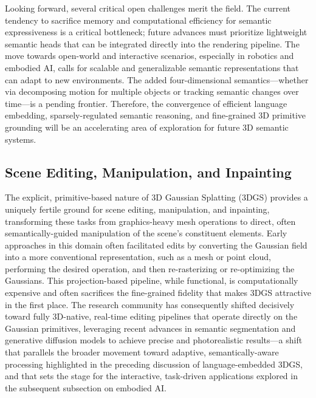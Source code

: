 \documentclass[11pt,a4paper]{article}
\begin{document}
Looking forward, several critical open challenges merit the field. The current tendency to sacrifice memory and computational efficiency for semantic expressiveness is a critical bottleneck; future advances must prioritize lightweight semantic heads that can be integrated directly into the rendering pipeline. The move towards open-world and interactive scenarios, especially in robotics and embodied AI, calls for scalable and generalizable semantic representations that can adapt to new environments. The added four-dimensional semantics---whether via decomposing motion for multiple objects or tracking semantic changes over time---is a pending frontier. Therefore, the convergence of efficient language embedding, sparsely-regulated semantic reasoning, and fine-grained 3D primitive grounding will be an accelerating area of exploration for future 3D semantic systems.


\subsection{Scene Editing, Manipulation, and Inpainting}


The explicit, primitive-based nature of 3D Gaussian Splatting (3DGS) provides a uniquely fertile ground for scene editing, manipulation, and inpainting, transforming these tasks from graphics-heavy mesh operations to direct, often semantically-guided manipulation of the scene's constituent elements. Early approaches in this domain often facilitated edits by converting the Gaussian field into a more conventional representation, such as a mesh or point cloud, performing the desired operation, and then re-rasterizing or re-optimizing the Gaussians. This projection-based pipeline, while functional, is computationally expensive and often sacrifices the fine-grained fidelity that makes 3DGS attractive in the first place. The research community has consequently shifted decisively toward fully 3D-native, real-time editing pipelines that operate directly on the Gaussian primitives, leveraging recent advances in semantic segmentation and generative diffusion models to achieve precise and photorealistic results---a shift that parallels the broader movement toward adaptive, semantically-aware processing highlighted in the preceding discussion of language-embedded 3DGS, and that sets the stage for the interactive, task-driven applications explored in the subsequent subsection on embodied AI.
\end{document}
